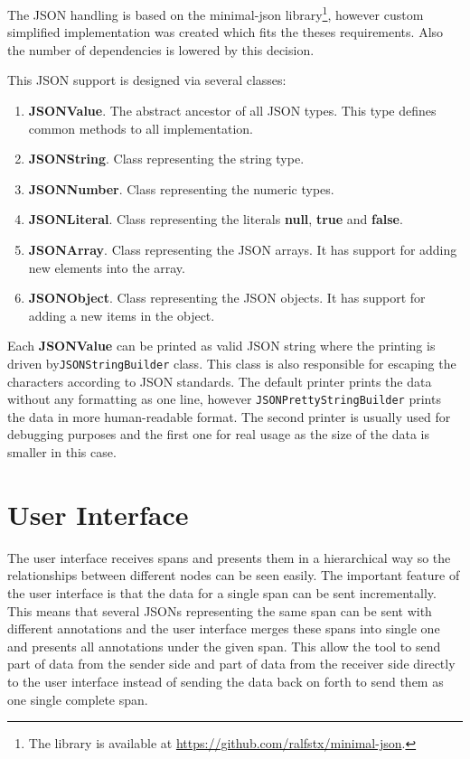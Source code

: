 The JSON handling is based on the minimal-json library\footnote{The library is available at \url{https://github.com/ralfstx/minimal-json}.}, however custom simplified implementation was created which fits the theses requirements. Also the number of dependencies is lowered by this decision. 

This JSON support is designed via several classes:
\begin{enumerate}
	\item \textbf{JSONValue}. The abstract ancestor of all JSON types. This type defines common methods to all implementation.
	\item \textbf{JSONString}. Class representing the string type.
	\item \textbf{JSONNumber}. Class representing the numeric types.
	\item \textbf{JSONLiteral}. Class representing the literals \textbf{null}, \textbf{true} and \textbf{false}.
	\item \textbf{JSONArray}. Class representing the JSON arrays. It has support for adding new elements into the array.
	\item \textbf{JSONObject}. Class representing the JSON objects. It has support for adding a new items in the object.
\end{enumerate}

Each \textbf{JSONValue} can be printed as valid JSON string where the printing is driven by\texttt{JSONStringBuilder} class. This class is also responsible for escaping the characters according to JSON standards. The default printer prints the data without any formatting as one line, however \texttt{JSONPrettyStringBuilder} prints the data in more human-readable format. The second printer is usually used for debugging purposes and the first one for real usage as the size of the data is smaller in this case.

\section{User Interface}
\label{sec:zipkin_ui}
The user interface receives spans and presents them in a hierarchical way so the relationships between different nodes can be seen easily. The important feature of the user interface is that the data for a single span can be sent incrementally. This means that several JSONs representing the same span can be sent with different annotations and the user interface merges these spans into single one and presents all annotations under the given span. This allow the tool to send part of data from the sender side and part of data from the receiver side directly to the user interface instead of sending the data back on forth to send them as one single complete span.

